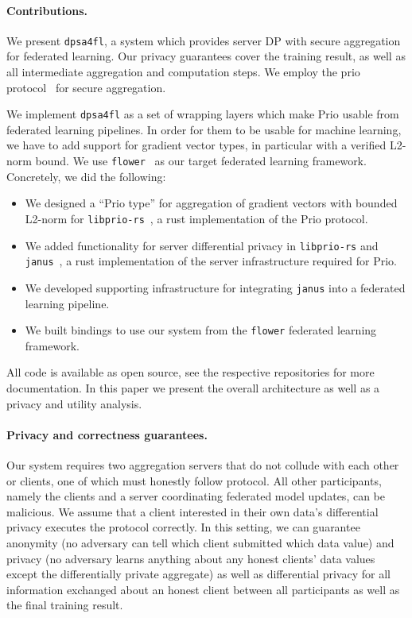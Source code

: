\documentclass{article}
\begin{document}
\paragraph{Contributions.}
We present \texttt{dpsa4fl}, a system which provides server DP with
secure aggregation for federated learning. Our privacy guarantees cover the training
result, as well as all intermediate aggregation and computation steps. We employ the
prio protocol~\cite{prio} for secure aggregation.

We implement \texttt{dpsa4fl} as a set of wrapping layers which make Prio usable
from federated learning pipelines. In order for
them to be usable for machine learning, we have to add support for gradient
vector types, in particular with a verified L2-norm bound. We use
\texttt{flower}~\cite{flower} as our target federated learning framework.
Concretely, we did the following:
\begin{itemize}
  \setlength\itemsep{0em}
\item We designed a ``Prio type'' for aggregation of gradient vectors with
  bounded L2-norm for \texttt{libprio-rs}~\cite{libprio-rs}, a rust implementation
  of the Prio protocol.
\item We added functionality for server differential privacy in
  \texttt{libprio-rs} and \texttt{janus}~\cite{janus}, a rust implementation of
  the server infrastructure required for Prio.
\item We developed supporting infrastructure for integrating \texttt{janus} into
  a federated learning pipeline.
\item We built bindings to use our system from the \texttt{flower} federated
  learning framework.
\end{itemize}
All code is available as open source, see the respective repositories\footnotemark{} for more
documentation. In this paper we present the overall architecture as well as a
privacy and utility analysis.


\paragraph{Privacy and correctness guarantees.}
Our system requires two aggregation servers that do not collude with each other or clients, one of which must honestly follow protocol. All other participants, namely the clients and a server coordinating federated model updates, can be malicious. We assume that a client interested in their own data's differential privacy executes the protocol correctly. In this setting, we can guarantee anonymity (no adversary can tell which client submitted which data value) and privacy (no adversary learns anything about any honest clients' data values except the differentially private aggregate) as well as differential privacy for all information exchanged about an honest client between all participants as well as the final training result.
\end{document}
